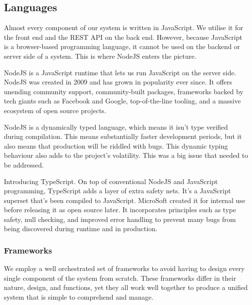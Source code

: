 \subsection{Languages}


Almost every component of our system is written in JavaScript. We utilise it for the front end and the REST API on the back end. However, because JavaScript is a browser-based programming language, it cannot be used on the backend or server side of a system. This is where NodeJS enters the picture.

\hspace{5mm}

NodeJS is a JavaScript runtime that lets us run JavaScript on the server side. NodeJS was created in 2009 and has grown in popularity ever since. It offers unending community support, community-built packages, frameworks backed by tech giants such as Facebook and Google, top-of-the-line tooling, and a massive ecosystem of open source projects.

\hspace{5mm}


NodeJS is a dynamically typed language, which means it isn't type verified during compilation. This means substantially faster development periods, but it also means that production will be riddled with bugs. This dynamic typing behaviour also adds to the project's volatility. This was a big issue that needed to be addressed.

\hspace{5mm}


Introducing TypeScript. On top of conventional NodeJS and JavaScript programming, TypeScript adds a layer of extra safety nets. It's a JavaScript superset that's been compiled to JavaScript. MicroSoft created it for internal use before releasing it as open source later. It incorporates principles such as type safety, null checking, and improved error handling to prevent many bugs from being discovered during runtime and in production.


\subsubsection{Frameworks}

We employ a well orchestrated set of frameworks to avoid having to design every single component of the system from scratch. These frameworks differ in their nature, design, and functions, yet they all work well together to produce a unified system that is simple to comprehend and manage.


